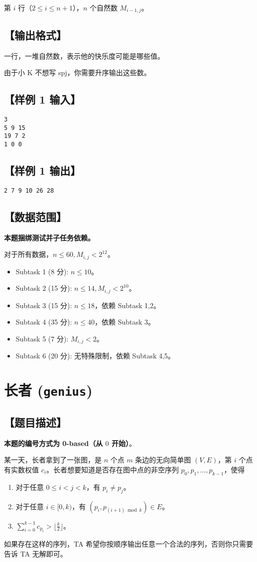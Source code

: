 \documentclass[UTF8]{ctexart}
\begin{document}
	第 $i$ 行（$2\le i\le n+1$），$n$ 个自然数 $M_{i-1,j}$。
	\subsection*{【输出格式】}
	一行，一堆自然数，表示他的快乐度可能是哪些值。
	
	由于小 K 不想写 spj，你需要升序输出这些数。
	\subsection*{【样例 1 输入】}
	\begin{lstlisting}
3
5 9 15
19 7 2
1 0 0
	\end{lstlisting}
	\subsection*{【样例 1 输出】}
	\begin{lstlisting}
2 7 9 10 26 28
	\end{lstlisting}
	\subsection*{【数据范围】}
	\textbf{本题捆绑测试并子任务依赖。}
	
	对于所有数据，$n\le 60,M_{i,j}<2^{12}$。
	\begin{itemize}
		\item{Subtask 1 (8 分): $n\le 10$。}
		\item{Subtask 2 (15 分): $n\le 14,M_{i,j}<2^{10}$。}
		\item{Subtask 3 (15 分): $n\le 18$，依赖 Subtask 1,2。}
		\item{Subtask 4 (35 分): $n\le 40$，依赖 Subtask 3。}
		\item{Subtask 5 (7 分): $M_{i,j}<2$。}
		\item{Subtask 6 (20 分): 无特殊限制，依赖 Subtask 4,5。}
	\end{itemize}
	\newpage
	\section*{长者 (\texttt{genius})}
	\subsection*{【题目描述】}
	\textbf{本题的编号方式为 0-based（从 $0$ 开始）}。
	
	某一天，长者拿到了一张图，是 $n$ 个点 $m$ 条边的无向简单图 $(V,E)$，第 $i$ 个点有实数权值 $c_i$。长者想要知道是否存在图中点的非空序列 $p_0,p_1,\dots,p_{k-1}$，使得
	\begin{enumerate}
		\item{对于任意 $0\le i<j<k$，有 $p_i\ne p_j$。}
		\item{对于任意 $i\in[0,k)$，有 $(p_i,p_{(i+1)\bmod k})\in E$。}
		\item{$\sum\limits_{i=0}^{k-1}c_{p_i}>\lfloor\frac k2\rfloor$。}
	\end{enumerate}
	\qquad 如果存在这样的序列，TA 希望你按顺序输出任意一个合法的序列，否则你只需要告诉 TA 无解即可。
	
\end{document}
